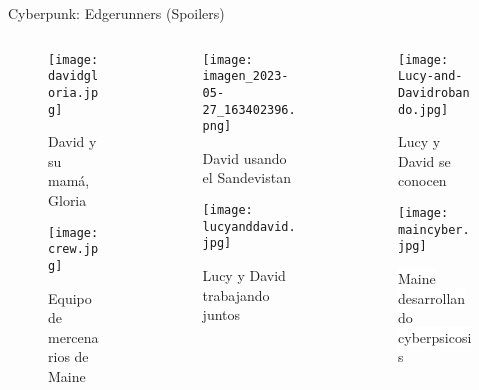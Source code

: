 \documentclass[aspectratio = 1609]{beamer}
\begin{document}
\begin{frame}{Cyberpunk: Edgerunners (Spoilers)}
\begin{columns}
    \begin{column}{.33\textwidth}
        \begin{figure}
            \texttt{[image: davidgloria.jpg]}
        \caption{David y su mamá, Gloria}
        \end{figure}
        \begin{figure}
            \texttt{[image: crew.jpg]}
        \caption{Equipo de mercenarios de Maine}
        \end{figure}
    \end{column}
    \begin{column}{.33\textwidth}
        \begin{figure}
            \texttt{[image: imagen\_2023-05-27\_163402396.png]}
        \caption{David usando el Sandevistan}
        \end{figure}
        \begin{figure}
            \texttt{[image: lucyanddavid.jpg]}
        \caption{Lucy y David trabajando juntos}
        \end{figure}
    \end{column}
    \begin{column}{.33\textwidth}
        \begin{figure}
            \texttt{[image: Lucy-and-Davidrobando.jpg]}
        \caption{Lucy y David se conocen}
        \end{figure}
        \begin{figure}
            \texttt{[image: maincyber.jpg]}
        \caption{\colorbox{white}{Maine desarrollando cyberpsicosis}}
        \end{figure}
    \end{column}
\end{columns}

\end{frame}


\begin{frame}[plain]

\end{frame}
\end{document}
